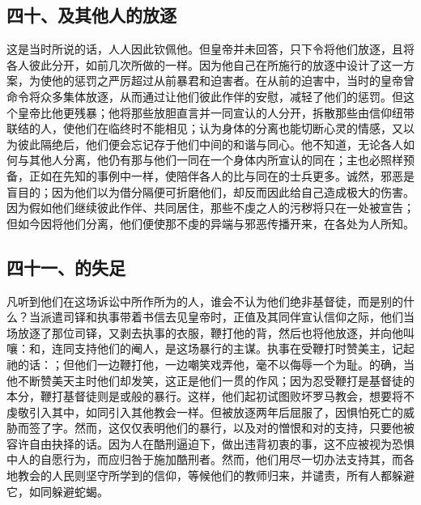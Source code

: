
\subsection{四十、及其他人的放逐}

这是当时所说的话，人人因此钦佩他。但皇帝并未回答，只下令将他们放逐，且将各人彼此分开，如前几次所做的一样。因为他自己在所施行的放逐中设计了这一方案，为使他的惩罚之严厉超过从前暴君和迫害者。在从前的迫害中，当时的皇帝曾命令将众多集体放逐，从而通过让他们彼此作伴的安慰，减轻了他们的惩罚。但这个皇帝比他更残暴；他将那些放胆直言并一同宣认的人分开，拆散那些由信仰纽带联结的人，使他们在临终时不能相见；认为身体的分离也能切断心灵的情感，又以为彼此隔绝后，他们便会忘记存于他们中间的和谐与同心。他不知道，无论各人如何与其他人分离，他仍有那与他们一同在一个身体内所宣认的同在；主也必照样预备，正如在先知的事例中一样，使陪伴各人的比与同在的士兵更多。诚然，邪恶是盲目的；因为他们以为借分隔便可折磨他们，却反而因此给自己造成极大的伤害。因为假如他们继续彼此作伴、共同居住，那些不虔之人的污秽将只在一处被宣告；但如今因将他们分离，他们便使那不虔的异端与邪恶传播开来，在各处为人所知。\par


\subsection{四十一、的失足}

凡听到他们在这场诉讼中所作所为的人，谁会不认为他们绝非基督徒，而是别的什么？当派遣司铎和执事带着书信去见皇帝时，正值及其同伴宣认信仰之际，他们当场放逐了那位司铎，又剥去执事的衣服，鞭打他的背，然后也将他放逐，并向他叫嚷：和，连同支持他们的阉人，是这场暴行的主谋。执事在受鞭打时赞美主，记起祂的话：；但他们一边鞭打他，一边嘲笑戏弄他，毫不以侮辱一个为耻。的确，当他不断赞美天主时他们却发笑，这正是他们一贯的作风；因为忍受鞭打是基督徒的本分，鞭打基督徒则是或般的暴行。这样，他们起初试图败坏罗马教会，想要将不虔敬引入其中，如同引入其他教会一样。但被放逐两年后屈服了，因惧怕死亡的威胁而签了字。然而，这仅仅表明他们的暴行，以及对的憎恨和对的支持，只要他被容许自由抉择的话。因为人在酷刑逼迫下，做出违背初衷的事，这不应被视为恐惧中人的自愿行为，而应归咎于施加酷刑者。然而，他们用尽一切办法支持其，而各地教会的人民则坚守所学到的信仰，等候他们的教师归来，并谴责，所有人都躲避它，如同躲避蛇蝎。\par

